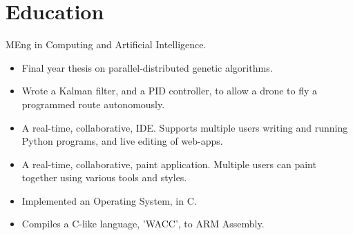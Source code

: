 \documentclass{jcgcv}
\begin{document}
\begin{column}



\section{Education}
MEng in Computing and Artificial Intelligence.

\vspace{2pt}

\begin{adjustwidth}{0.3cm}{}

\begin{itemize}
  \item Final year thesis on parallel-distributed genetic algorithms.
\end{itemize}

\begin{itemize}
  \item Wrote a Kalman filter, and a PID controller, to allow a drone to fly a programmed route autonomously.
\end{itemize}

\begin{itemize}
  \item A real-time, collaborative, IDE. Supports multiple users writing and running Python programs, and live editing of web-apps.
\end{itemize}

\begin{itemize}
  \item A real-time, collaborative, paint application. Multiple users can paint together using various tools and styles.
\end{itemize}

\begin{itemize}
  \item Implemented an Operating System, in C.
\end{itemize}

\begin{itemize}
  \item Compiles a C-like language, 'WACC', to ARM Assembly.
\end{itemize}


\end{adjustwidth}
\end{column}
\end{document}
